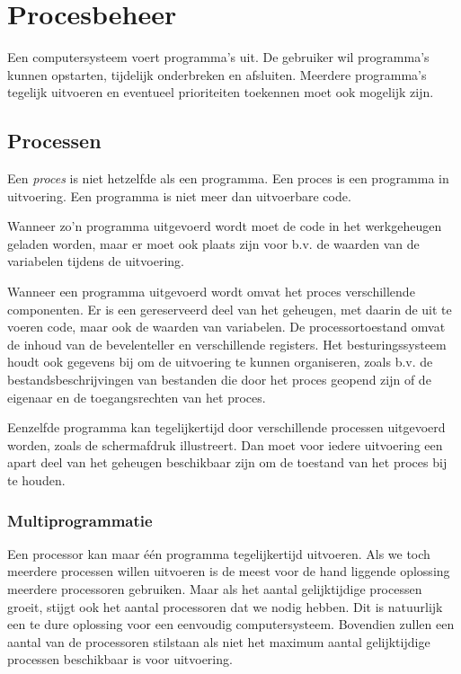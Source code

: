 \chapter{Procesbeheer}\label{procesbeheer}

Een computersysteem voert programma's uit. De gebruiker wil
programma's kunnen opstarten, tijdelijk onderbreken en afsluiten. Meerdere
programma's tegelijk uitvoeren en eventueel prioriteiten toekennen moet
ook mogelijk zijn.

\section{Processen}

Een \emph{proces} is niet hetzelfde als een
programma. Een proces is een programma in uitvoering. Een programma is
niet meer dan uitvoerbare code.

Wanneer zo'n programma uitgevoerd wordt moet de code in het
werkgeheugen geladen worden, maar er moet ook plaats zijn voor b.v. de
waarden van de variabelen tijdens de uitvoering.

Wanneer een programma uitgevoerd wordt omvat het proces
verschillende componenten. Er is een gereserveerd deel van het geheugen,
met daarin de uit te voeren code, maar ook de waarden van variabelen. De
processortoestand omvat de inhoud van de bevelenteller en verschillende
registers. Het besturingssysteem houdt ook gegevens bij om de uitvoering
te kunnen organiseren, zoals b.v. de bestandsbeschrijvingen van
bestanden die door het proces geopend zijn of de eigenaar en de
toegangsrechten van het proces.

Eenzelfde programma kan tegelijkertijd door verschillende
processen uitgevoerd worden, zoals de schermafdruk illustreert. Dan moet
voor iedere uitvoering een apart deel van het geheugen beschikbaar zijn
om de toestand van het proces bij te houden.

\subsection{Multiprogrammatie}

Een processor kan maar \'e\'en programma tegelijkertijd uitvoeren.
Als we toch meerdere processen willen uitvoeren is de meest voor de
hand liggende oplossing meerdere processoren gebruiken. Maar als het
aantal gelijktijdige processen groeit, stijgt ook het aantal
processoren dat we nodig hebben. Dit is natuurlijk een te dure
oplossing voor een eenvoudig computersysteem. Bovendien zullen een
aantal van de processoren stilstaan als niet het maximum aantal
gelijktijdige processen beschikbaar is voor uitvoering.

